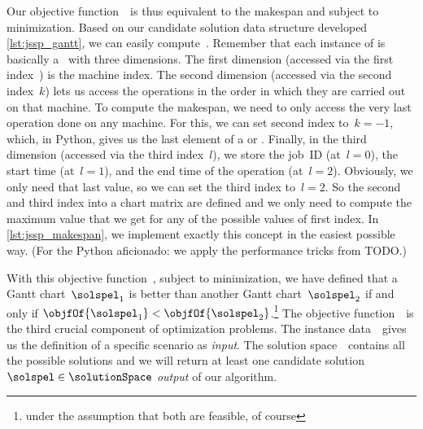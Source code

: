 Our objective function~\objf\ is thus equivalent to the makespan and subject to minimization.
Based on our candidate solution data structure  developed \autoref{lst:jssp_gantt}, we can easily compute~\objf.
Remember that each instance of  is basically a \numpyndarray\ with three dimensions.
The first dimension (accessed via the first index~\jsspMachineIndex) is the machine index.
The second dimension (accessed via the second index~$k$) lets us access the operations in the order in which they are carried out on that machine.
To compute the makespan, we need to only access the very last operation done on any machine.
For this, we can set second index to~$k=-1$, which, in Python, gives us the last element of a  or \numpyndarray.
Finally, in the third dimension (accessed via the third index~$l$), we store the job~ID (at~$l=0$), the start time (at~$l=1$), and the end time of the operation (at~$l=2$).
Obviously, we only need that last value, so we can set the third index to~$l=2$.
So the second and third index into a  chart matrix are defined and we only need to compute the maximum value that we get for any of the possible values of first index.
In \autoref{lst:jssp_makespan}, we implement exactly this concept in the easiest possible way.
(For the Python aficionado: we apply the performance tricks from TODO.)


With this objective function~\objf, subject to minimization, we have defined that a Gantt chart~$\solspel_1$ is better than another Gantt chart~$\solspel_2$ if and only if $\objfOf{\solspel_1}<\objfOf{\solspel_2}$.\footnote{under the assumption that both are feasible, of course}
\endhsection%
%
%
%
The objective function~\objf\ is the third crucial component of optimization problems.
The instance data~\instance\ gives us the definition of a specific scenario as \emph{input}.
The solution space~\solutionSpace\ contains all the possible solutions and we will return at least one candidate solution~$\solspel\in\solutionSpace$ \emph{output} of our algorithm.
%
%
%
\endhsection%
\endhsection%
%
